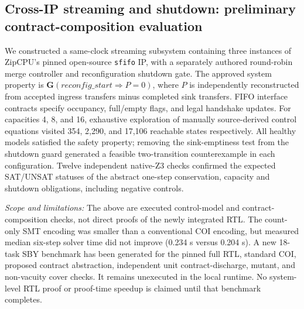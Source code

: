 \subsection{Cross-IP streaming and shutdown: preliminary contract-composition evaluation}
We constructed a same-clock streaming subsystem containing three instances of
ZipCPU's pinned open-source \texttt{sfifo} IP, with a separately authored
round-robin merge controller and reconfiguration shutdown gate. The approved
system property is \(\mathbf G(\mathit{reconfig\_start}\!\Rightarrow\!P=0)\),
where \(P\) is independently reconstructed from accepted ingress transfers
minus completed sink transfers. FIFO interface contracts specify occupancy,
full/empty flags, and legal handshake updates. For capacities 4, 8, and 16,
exhaustive exploration of manually source-derived control equations visited
354, 2,290, and 17,106 reachable states respectively. All healthy models
satisfied the safety property; removing the sink-emptiness test from the
shutdown guard generated a feasible two-transition counterexample in each
configuration. Twelve independent native-Z3 checks confirmed the expected
SAT/UNSAT statuses of the abstract one-step conservation, capacity and
shutdown obligations, including negative controls.

\emph{Scope and limitations:} The above are executed control-model and
contract-composition checks, not direct proofs of the newly integrated RTL.
The count-only SMT encoding was smaller than a conventional COI encoding,
but measured median six-step solver time did not improve (0.234 s versus
0.204 s). A new 18-task SBY benchmark has been generated for the pinned
full RTL, standard COI, proposed contract abstraction, independent unit
contract-discharge, mutant, and non-vacuity cover checks. It remains
unexecuted in the local runtime. No system-level RTL proof or proof-time
speedup is claimed until that benchmark completes.

